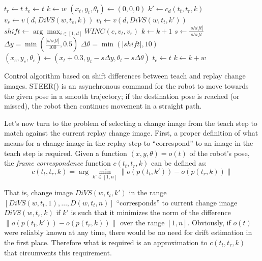 \documentclass[twocolumn, 9pt,fleqn]{jsproceedings}
\begin{document}
\begin{algorithm}
\begin{algorithmic}
\State $t_r \gets t$ 
\State $t_e \gets t$
\State $k \gets w$
\State $(x_t, y_t, \theta_t) \gets (0, 0, 0)$ 
\State {} 
\Repeat
    \State {} 
    \State $k' \gets c_d(t_t, t_r, k)$
    \State $v_r \gets v(d, DiVS(w, t_e, k))$
    \State $v_t \gets v(d, DiVS(w, t_t, k'))$
    \State $shift \gets \arg \max_{i \in [1, d]}{WINC(e, v_t, v_r)}$
        \State $k \gets k + 1$
    \Else
        \State $s \gets \frac{|shift|}{shift}$ 
        \State $\Delta y = \min{(\frac{|shift|}{100}, 0.5)}$
        \State $\Delta \theta = \min{(|shift|, 10)}$
        \State $(x_e, y_e, \theta_e) \gets (x_t + 0.3, y_t - s \Delta y, \theta_t - s \Delta \theta)$
        \State {} 
        \State {}
        \State $t_e \gets t$
        \State $k \gets k + w$
    \EndIf
{}
\end{algorithmic}
\caption{Control algorithm based on shift differences between teach and replay change images. STEER() is an asynchronous command for the robot to move towards the given pose in a smooth trajectory; if the destination pose is reached (or missed), the robot then continues movement in a straight path.}
\label{alg:control}
\end{algorithm}

Let's now turn to the problem of selecting a change image from the teach step to match against the current replay change image. First, a proper definition of what means for a change image in the replay step to ``correspond'' to an image in the teach step is required. Given a function $(x, y, \theta) = o(t)$ of the robot's pose, the \textit{frame correspondence} function $c(t_t, t_r, k)$ can be defined as:
\begin{equation}
c(t_t, t_r, k) = \arg \min_{k' \in [1, n]} {\| o(p(t_t, k')) - o(p(t_r, k)) \|}
\end{equation}

That is, change image $DiVS(w, t_t, k')$ in the range $[DiVS(w, t_t, 1), \dotsc, D(w, t_t, n)]$ ``corresponds'' to current change image $DiVS(w, t_r, k)$ if $k'$ is such that it minimizes the norm of the difference $\| o(p(t_t, k')) - o(p(t_r, k)) \|$ over the range $[1, n]$. Obviously, if $o(t)$ were reliably known at any time, there would be no need for drift estimation in the first place. Therefore what is required is an approximation to $c(t_t, t_r, k)$ that circumvents this requirement.
\end{document}
